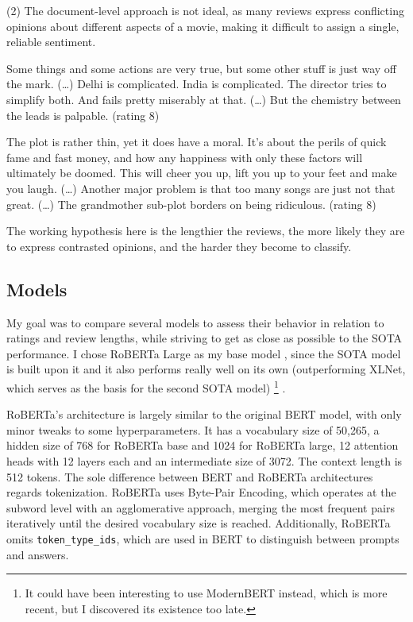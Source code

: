 \documentclass{article}
\begin{document}
(2) The document-level approach is not ideal, as many reviews express conflicting opinions about different aspects of a movie, making it difficult to assign a single, reliable sentiment.

\begin{displayquote}
Some things and some actions are very true, but some other stuff is just way off the mark. (…) Delhi is complicated. India is complicated. The director tries to simplify both. And fails pretty miserably at that. (…) But the chemistry between the leads is palpable. (rating 8)

The plot is rather thin, yet it does have a moral. It's about the perils of quick fame and fast money, and how any happiness with only these factors will ultimately be doomed. This will cheer you up, lift you up to your feet and make you laugh. (…) Another major problem is that too many songs are just not that great. (…) The grandmother sub-plot borders on being ridiculous. (rating 8)
\end{displayquote}
The working hypothesis here is the lengthier the reviews, the more likely they are to express contrasted opinions, and the harder they become to classify.

\subsection{Models}

My goal was to compare several models to assess their behavior in relation to ratings and review lengths, while striving to get as close as possible to the SOTA performance. I chose RoBERTa Large \citep{liu_roberta_2019} as my base model , since the SOTA model is built upon it and it also performs really well on its own (outperforming XLNet, which serves as the basis for the second SOTA model) 
\footnote{It could have been interesting to use ModernBERT \citep{warner_smarter_2024} instead, which is more recent, but I discovered its existence too late.}
.

RoBERTa's architecture is largely similar to the original BERT model, with only minor tweaks to some hyperparameters. It has a vocabulary size of 50,265, a hidden size of 768 for RoBERTa base and 1024 for RoBERTa large, 12 attention heads with 12 layers each and an intermediate size of 3072. The context length is 512 tokens. The sole difference between BERT and RoBERTa architectures regards tokenization. RoBERTa uses Byte-Pair Encoding, which operates at the subword level with an agglomerative approach, merging the most frequent pairs iteratively until the desired vocabulary size is reached. Additionally, RoBERTa omits \texttt{token\_type\_ids}, which are used in BERT to distinguish between prompts and answers.
\end{document}
